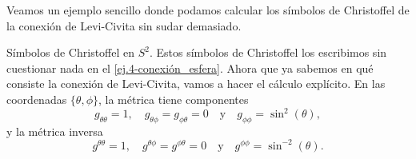 Veamos un ejemplo sencillo donde podamos calcular los símbolos de Christoffel de la conexión de Levi-Civita sin sudar demasiado.
\begin{example}
    {Símbolos de Christoffel en \(S^2\).
    \label{ej.4-christoffel_S2}}
    Estos símbolos de Christoffel los escribimos sin cuestionar nada en el \cref{ej.4-conexión_esfera}. Ahora que ya sabemos en qué consiste la conexión de Levi-Civita, vamos a hacer el cálculo explícito. En las coordenadas \(\{\theta,\phi\}\), la métrica tiene componentes
    \begin{equation*}
        g_{\theta\theta} = 1,\quad g_{\theta\phi}=g_{\phi\theta}=0\quad\text{y}\quad g_{\phi\phi} = \sin^2(\theta),
    \end{equation*}
    y la métrica inversa
    \begin{equation*}
        g^{\theta\theta} = 1,\quad g^{\theta\phi}=g^{\phi\theta}=0\quad\text{y}\quad g^{\phi\phi} = \sin^{-2}(\theta).
    \end{equation*}


\end{example}
